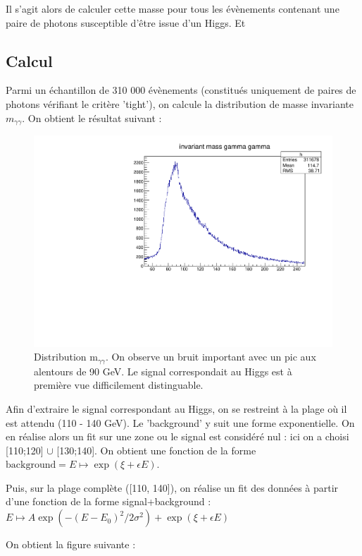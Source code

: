 \documentclass[11pt]{article} %
\begin{document}
Il s'agit alors de calculer cette masse pour tous les évènements contenant une paire de photons susceptible d'être issue d'un Higgs. Et 

\subsection{Calcul}

Parmi un échantillon de 310 000 évènements (constitués uniquement de paires de photons vérifiant le critère 'tight'), on calcule la distribution de masse invariante $m_{\gamma \gamma}$. On obtient le résultat suivant :

\begin{figure}[H]
  \caption{Distribution m$_{\gamma \gamma}$. On observe un bruit important avec un pic aux alentours de 90 GeV. Le signal correspondait au Higgs est à première vue difficilement distinguable. }
\includegraphics{../graphes/mgg_medium}
\end{figure}

Afin d'extraire le signal correspondant au Higgs, on se restreint à la plage où il est attendu (110 - 140 GeV). Le 'background' y suit une forme exponentielle. On en réalise alors un fit sur une zone ou le signal est considéré nul : ici on a choisi [110;120] $\cup$  [130;140]. On obtient une fonction de la forme $\textrm{background} = E \mapsto \exp(\xi + \epsilon E)$.

Puis, sur la plage complète ([110, 140]), on réalise un fit des données à partir d'une fonction de la forme signal+background : $E \mapsto  A \exp\left(-(E-E_0)^2/2\sigma^2\right) + \exp(\xi + \epsilon E)$

On obtient la figure suivante :
\end{document}

